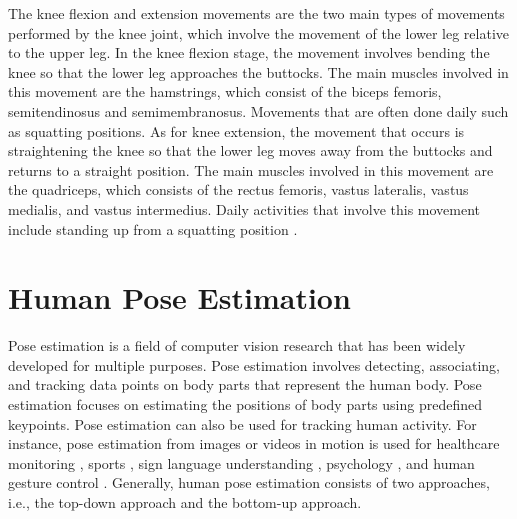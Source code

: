 The knee flexion and extension movements are the two main types of movements performed by the knee joint, which involve the movement of the lower leg relative to the upper leg. In the knee flexion stage, the movement involves bending the knee so that the lower leg approaches the buttocks. The main muscles involved in this movement are the hamstrings, which consist of the biceps femoris, semitendinosus and semimembranosus. Movements that are often done daily such as squatting positions. As for knee extension, the movement that occurs is straightening the knee so that the lower leg moves away from the buttocks and returns to a straight position. The main muscles involved in this movement are the quadriceps, which consists of the rectus femoris, vastus lateralis, vastus medialis, and vastus intermedius. Daily activities that involve this movement include standing up from a squatting position \cite{KneeFlexionExtension}.

\section{Human Pose Estimation}
Pose estimation is a field of computer vision research that has been widely developed for multiple purposes. Pose estimation involves detecting, associating, and tracking data points on body parts that represent the human body. Pose estimation focuses on estimating the positions of body parts using predefined keypoints. Pose estimation can also be used for tracking human activity. For instance, pose estimation from images or videos in motion is used for healthcare monitoring \cite{healthcare1,healthcare2}, sports \cite{sport1, sport2, sport3}, sign language understanding \cite{signlanguage1,signlanguage2,signlanguage3}, psychology \cite{Psychology1,Psychology2, Psychology3}, and human gesture control \cite{BlazePose, Heuristic}. Generally, human pose estimation consists of two approaches, i.e., the top-down approach and the bottom-up approach.


